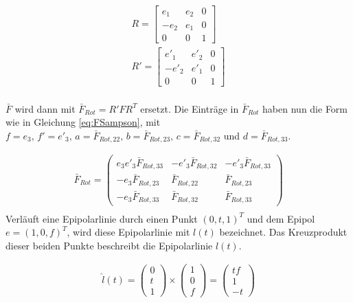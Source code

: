 \begin{gather}
	R = \begin{bmatrix}
		e_1&e_2&0\\
		-e_2&e_1&0\\
		0&0&1
	\end{bmatrix}\\
	R' = \begin{bmatrix}
	e'_1&e'_2&0\\
	-e'_2&e'_1&0\\
	0&0&1
\end{bmatrix}
\end{gather}\\

$\bar{F}$ wird dann mit $\bar{F}_{Rot} = R'FR^T$ ersetzt. Die Einträge in $\bar{F}_{Rot}$ haben nun die Form wie in Gleichung \ref{eq:FSampson}, mit $f = e_3, \, f' = e'_3, \, a = \bar{F}_{Rot,22}, \, b = \bar{F}_{Rot,23}, \, c = \bar{F}_{Rot,32}$ und $d = \bar{F}_{Rot,33}$.

\begin{gather}
	\bar{F}_{Rot} = 
\begin{pmatrix}
	e_3e'_3 \bar{F}_{Rot,33}&-e'_3 \bar{F}_{Rot,32}&-e'_3\bar{F}_{Rot,33}\\
	-e_3 \bar{F}_{Rot,23} & \bar{F}_{Rot,22} &\bar{F}_{Rot,23}\\
	-e_3 \bar{F}_{Rot,33}& \bar{F}_{Rot,32} &\bar{F}_{Rot,33} \label{eq:SampsonFRot}
\end{pmatrix}\\
\end{gather}
Verläuft eine Epipolarlinie durch einen Punkt $(0,t,1)^T$ und dem Epipol $e = (1,0,f)^T$, wird diese Epipolarlinie mit $l(t)$ bezeichnet. Das Kreuzprodukt dieser beiden Punkte beschreibt die Epipolarlinie $l(t)$\cite{HZ}. 

\begin{gather}
\hat{l}(t)=
	\begin{pmatrix}
	0\\t\\1
	\end{pmatrix} \times
	\begin{pmatrix}
	1\\0\\f
	\end{pmatrix} = 
	\begin{pmatrix}
	tf\\1\\-t
	\end{pmatrix}
\end{gather}

